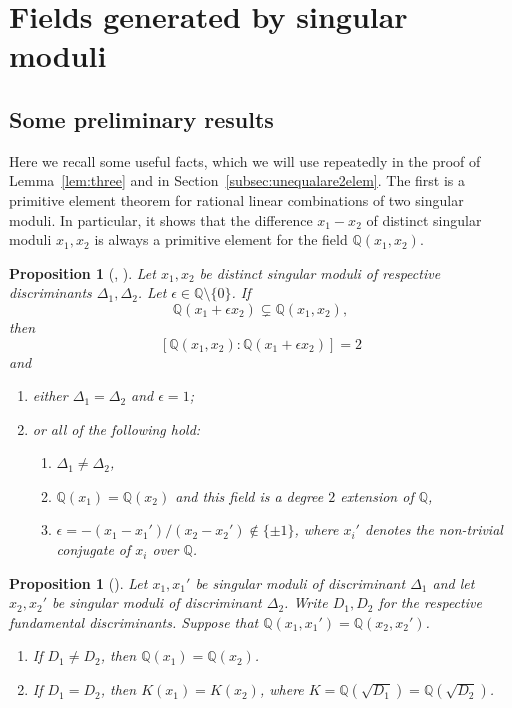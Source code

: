 \documentclass[12pt,a4paper,oneside]{amsart}
\newtheorem{proposition}[theorem]{Proposition}
\begin{document}
\section{Fields generated by singular moduli}\label{sec:fields}

\subsection{Some preliminary results}

Here we recall some useful facts, which we will use repeatedly in the proof of Lemma~\ref{lem:three} and in Section~\ref{subsec:unequalare2elem}. The first is a primitive element theorem for rational linear combinations of two singular moduli. In particular, it shows that the difference $x_1 - x_2$ of distinct singular moduli $x_1, x_2$ is always a primitive element for the field $\mathbb{Q}(x_1, x_2)$.

\begin{proposition}[{\cite[Ex.~1.4 \& Th.~1.5]{BiluFayeZhu19}, \cite[Th.~4.1]{FayeRiffaut18}}]\label{prop:prim}
    Let $x_1, x_2$ be distinct singular moduli of respective discriminants $\Delta_1, \Delta_2$. Let $\epsilon \in \mathbb{Q} \setminus \{0\}$. If
    \[ \mathbb{Q}(x_1 + \epsilon x_2) \subsetneq \mathbb{Q}(x_1, x_2),\]
    then 
    \[ \left[ \mathbb{Q}\left(x_1, x_2\right) : \mathbb{Q}\left(x_1 + \epsilon x_2\right) \right] = 2\]
    and
    \begin{enumerate}
        \item either $\Delta_1 = \Delta_2$ and $\epsilon = 1$;
        \item or all of the following hold:
        \begin{enumerate}
            \item $\Delta_1 \neq \Delta_2$,
            \item $\mathbb{Q}(x_1) = \mathbb{Q}(x_2)$ and this field is a degree $2$ extension of $\mathbb{Q}$,
            \item $\epsilon = -(x_1 - x_1')/(x_2 - x_2') \notin \{\pm 1\}$, where $x_i'$ denotes the non-trivial conjugate of $x_i$ over $\mathbb{Q}$.
        \end{enumerate}
    \end{enumerate}
\end{proposition}

\begin{proposition}[{\cite[Lemma~7.1]{BiluFayeZhu19}}]\label{prop:2fields}
    Let $x_1, x_1'$ be singular moduli of discriminant $\Delta_1$ and let $x_2, x_2'$ be singular moduli of discriminant $\Delta_2$. Write $D_1, D_2$ for the respective fundamental discriminants. Suppose that $\mathbb{Q}(x_1, x_1') = \mathbb{Q}(x_2, x_2')$.
    \begin{enumerate}
        \item If $D_1 \neq D_2$, then $\mathbb{Q}(x_1) = \mathbb{Q}(x_2)$.
        \item If $D_1 = D_2$, then $K(x_1) = K(x_2)$, where $K = \mathbb{Q}(\sqrt{D_1}) = \mathbb{Q}(\sqrt{D_2})$.
    \end{enumerate}
\end{proposition}
\end{document}
